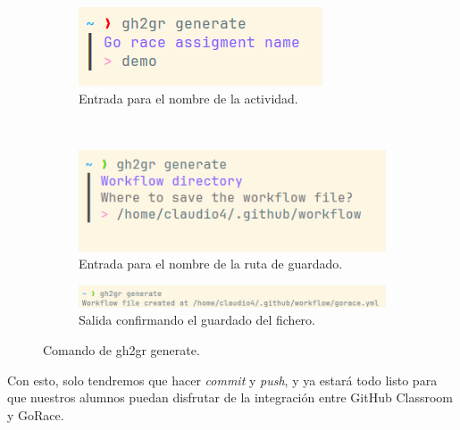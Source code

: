 \begin{figure}
\begin{subfigure}{0.4\textwidth}
        \label{fig:client-generate-3}
    \end{subfigure}
    \hspace*{\fill}   %
    \begin{subfigure}{0.4\textwidth}
       \includegraphics[width=1\linewidth]{images/client-generate-4.png}
        \caption{Entrada para el nombre de la actividad.}
        \label{fig:client-generate-4}
    \end{subfigure}
    \\
    \begin{subfigure}{0.4\textwidth}
       \includegraphics[width=1\linewidth]{images/client-generate-5.png}
        \caption{Entrada para el nombre de la ruta de guardado.}
        \label{fig:client-generate-5}
    \end{subfigure}
    \hspace*{\fill}
    \begin{subfigure}{0.4\textwidth}
       \includegraphics[width=1\linewidth]{images/client-generate-6.png}
        \caption{Salida confirmando el guardado del fichero.}
        \label{fig:client-generate-6}
    \end{subfigure}
    \caption{Comando de gh2gr generate.}
\end{figure}

Con esto, solo tendremos que hacer \textit{commit} y \textit{push}, y ya estará todo listo para que nuestros alumnos puedan disfrutar de la integración entre GitHub Classroom y GoRace.
